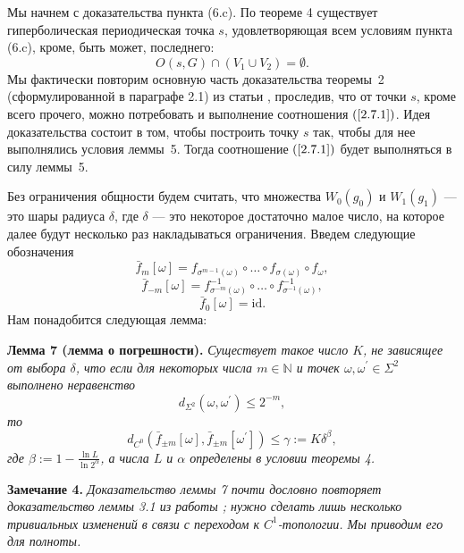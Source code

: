 \documentclass[12pt]{article}
\begin{document}
Мы начнем с доказательства пункта (6.c). По теореме 4 существует гиперболическая периодическая точка $s$, удовлетворяющая всем условиям пункта (6.c), кроме, быть может, последнего:
\begin{equation}
\label{2.7.1}
O(s,G)\cap(V_1\cup V_2)=\emptyset.
\end{equation}
Мы фактически повторим основную часть доказательства теоремы~2 (сформулированной в параграфе 2.1) из статьи \cite{17}, проследив, что от точки $s$, кроме всего прочего, можно потребовать и выполнение соотношения $(\ref{2.7.1})$. Идея доказательства состоит в том, чтобы построить точку $s$ так, чтобы для нее выполнялись условия леммы~5. Тогда соотношение $(\ref{2.7.1})$ будет выполняться в силу леммы~5. 

Без ограничения общности будем считать, что множества $W_0(g_0)$ и $W_1(g_1)$ --- это шары радиуса $\delta$, где $\delta$ --- это некоторое достаточно малое число, на которое далее будут несколько раз накладываться ограничения.
Введем следующие обозначения
$$\bar{f}_m[\omega]=f_{\sigma^{m-1}(\omega)}\circ\ldots\circ f_{\sigma(\omega)}\circ f_{\omega},$$
$$\bar{f}_{-m}[\omega]=f^{-1}_{\sigma^{-m}(\omega)}\circ\ldots\circ f^{-1}_{\sigma^{-1}(\omega)},$$
$$\bar{f}_0[\omega]=\mbox{id}.$$
Нам понадобится следующая лемма:

\textbf{Лемма 7 (лемма о погрешности).}\textit{ Существует такое число $K$, не зависящее от выбора $\delta$, что если для некоторых числа $m\in\mathbb{N}$ и точек $\omega,\omega^{\prime}\in\Sigma^2$ выполнено неравенство
$$d_{\Sigma^2}(\omega,\omega^{\prime})\leq 2^{-m},$$
то
$$d_{C^0}(\bar{f}_{\pm m}[\omega],\bar{f}_{\pm m}[\omega^{\prime}])\leq\gamma:=K\delta^{\beta},$$
где $\beta:=1-\frac{\ln L}{\ln 2^{\alpha}}$, а числа $L$ и $\alpha$ определены в условии теоремы 4.
}

\textbf{Замечание 4.}\textit{ Доказательство леммы 7 почти дословно повторяет доказательство леммы 3.1 из работы \cite{17}; нужно сделать лишь несколько тривиальных изменений в связи с переходом к $C^1$-топологии. Мы приводим его для полноты.}
\end{document}
